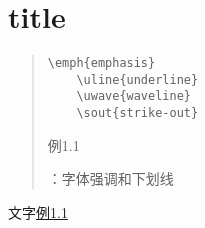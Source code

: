 \documentclass{ctexbook}
\begin{document}
 
\section{title} 
    \begin{quote} 
    \begin{Verbatim}[gobble=4] 
    \emph{emphasis} 
    \uline{underline} 
    \uwave{waveline} 
    \sout{strike-out} 
    \end{Verbatim} 
    \centering 
    \hypertarget{ex:emphasis}{例1.1}：字体强调和下划线 
    \end{quote} 
\newpage
\newpage
文字\hyperlink{ex:emphasis}{例1.1} 
\end{document}
